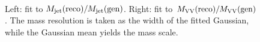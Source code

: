 \begin{figure}[h!]
\centering
{}
\\
\caption{Left: fit to $M_{\rm jet}(\mathrm{reco})/M_{\rm jet}(\mathrm{gen})$. Right: fit to $M_{\rm VV}(\mathrm{reco})/M_{\rm VV}(\mathrm{gen})$. 
The mass resolution is taken as the width of the fitted Gaussian, while the Gaussian mean yields the mass scale.}
\label{fig:resoFits}
\end{figure}
